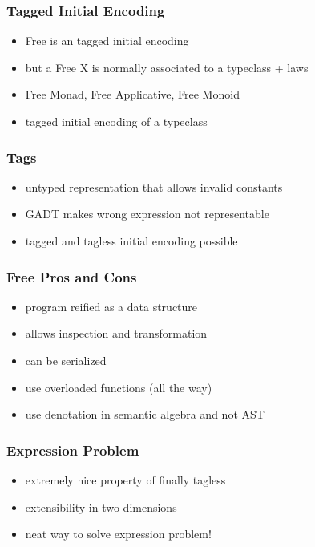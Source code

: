 \documentclass[aspectratio=169, hyperref={colorlinks, linkcolor=beamer@centricgreen}, urlcolor=links]{beamer}
\begin{document}
\begin{frame}
  \frametitle{Tagged Initial Encoding}
  \begin{itemize}
  \item Free is an tagged initial encoding
  \item but a Free X is normally associated to a typeclass + laws
  \item Free Monad, Free Applicative, Free Monoid
  \item tagged initial encoding of a typeclass
  \end{itemize}
\end{frame}

\begin{frame}
  \frametitle{Tags}
  \begin{itemize}
  \item untyped representation that allows invalid constants
  \item GADT makes wrong expression not representable
  \item tagged and tagless initial encoding possible
  \end{itemize}
\end{frame}

\begin{frame}
  \frametitle{Free \textemdash{} Pros and Cons}
  \begin{itemize}
  \item program reified as a data structure
  \item allows inspection and transformation
  \item can be serialized
  \end{itemize}
\end{frame}

\begin{frame}
  \begin{itemize}
  \item use overloaded functions (all the way)
  \item use denotation in semantic algebra and not AST
  \end{itemize}
\end{frame}

\begin{frame}
  \frametitle{Expression Problem}
  \begin{itemize}
  \item extremely nice property of finally tagless
  \item extensibility in two dimensions
  \item neat way to solve expression problem!
  \end{itemize}
\end{frame}
\end{document}
